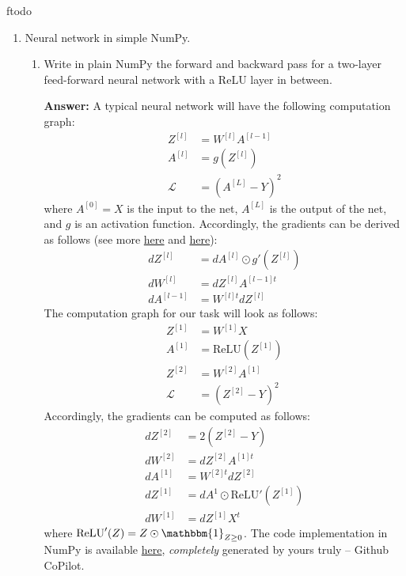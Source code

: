 ƒtodo\documentclass{article}
\newenvironment{QandA}{\begin{enumerate}[label=\arabic*.]}{\end{enumerate}}
\newenvironment{InnerQandA}{\begin{enumerate}[label=\roman*.]}{\end{enumerate}}
\newenvironment{answer}{\par\normalfont \textbf{Answer:}}{}
\begin{document}
\begin{QandA}
    \item Neural network in simple NumPy.
    \begin{InnerQandA}
        \item Write in plain NumPy the forward and backward pass for a two-layer feed-forward neural network with a ReLU layer in between.
        \begin{answer}
            A typical neural network will have the following computation graph:
            \begin{align*}
                Z^{[l]} &= W^{[l]} A^{[l-1]} \\
                A^{[l]} &= g(Z^{[l]}) \\
                \mathcal{L} &= \left( A^{[L]} - Y \right)^2
            \end{align*}
            where $A^{[0]} = X$ is the input to the net, $A^{[L]}$ is the output of the net, and $g$ is an activation function. Accordingly, the gradients can be derived as follows (see more \href{https://edwardshu.com/posts/matrix-matrix-gradient}{here} and \href{https://towardsdatascience.com/lets-code-a-neural-network-in-plain-numpy-ae7e74410795}{here}):
            \begin{align*}
                dZ^{[l]} &= dA^{[l]} \odot g'(Z^{[l]}) \\
                dW^{[l]} &= dZ^{[l]} A^{[l-1]t} \\
                dA^{[l-1]} &= W^{[l]t} dZ^{[l]}
            \end{align*}
            The computation graph for our task will look as follows:
            \begin{align*}
                Z^{[1]} &= W^{[1]}X \\
                A^{[1]} &= \text{ReLU}(Z^{[1]}) \\
                Z^{[2]} &= W^{[2]} A^{[1]} \\
                \mathcal{L} &= \left( Z^{[2]} - Y \right)^2
            \end{align*}
            Accordingly, the gradients can be computed as follows:
            \begin{align*}
                dZ^{[2]} &= 2(Z^{[2]} - Y)\\
                dW^{[2]} &= dZ^{[2]} A^{[1]t} \\
                dA^{[1]} &= W^{[2]t} dZ^{[2]} \\ 
                dZ^{[1]} &= dA^{1} \odot \text{ReLU}' (Z^{[1]}) \\
                dW^{[1]} &= dZ^{[1]} X^t
            \end{align*}
            where $\text{ReLU}'(Z) = Z \odot \mathbbm{1}_{Z \ge 0}$. The code implementation in NumPy is available \href{https://gist.github.com/zaf-stojano/136b6cc1675bb0e14972d937c390b7a6}{here}, \textit{completely} generated by yours truly -- Github CoPilot.
        \end{answer}


\end{InnerQandA}
\end{QandA}
\end{document}
